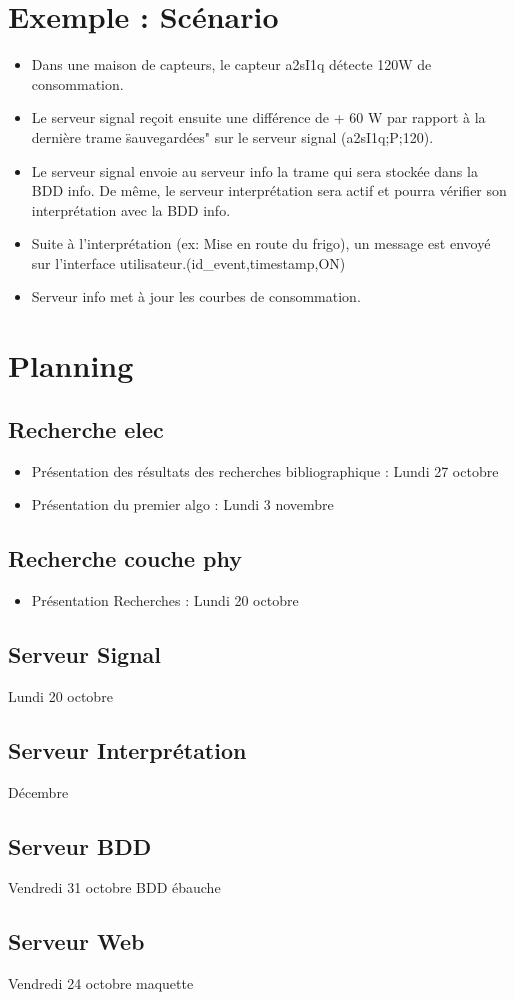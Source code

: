 \documentclass[10pt,a4paper]{article}
\begin{document}
\section{Exemple : Scénario}
\begin{itemize}
  \item Dans une maison de capteurs, le capteur a2sI1q détecte 120W de consommation.
  \item Le serveur signal reçoit ensuite une différence de + 60 W par rapport à la dernière trame \"sauvegardées" sur le serveur signal (a2sI1q;P;120).
  \item Le serveur signal envoie au serveur info la trame qui sera stockée dans la BDD info. De même, le serveur interprétation sera actif et pourra vérifier son interprétation avec la BDD info.
  \item Suite à l'interprétation (ex: Mise en route du frigo), un message est envoyé sur l'interface utilisateur.(id\_event,timestamp,ON)
  \item Serveur info met à jour les courbes de consommation.
\end{itemize}





\section{Planning}
\subsection{Recherche elec}
\begin{itemize}
	\item Présentation des résultats des recherches bibliographique : Lundi 27 octobre
	\item Présentation du premier algo : Lundi 3 novembre
\end{itemize}
\subsection{Recherche couche phy}
\begin{itemize}
	\item Présentation Recherches : Lundi 20 octobre
\end{itemize}
\subsection{Serveur Signal}
Lundi 20 octobre
\subsection{Serveur Interprétation}
Décembre
\subsection{Serveur BDD}
Vendredi 31 octobre BDD ébauche
\subsection{Serveur Web}
Vendredi 24 octobre maquette
\end{document}
